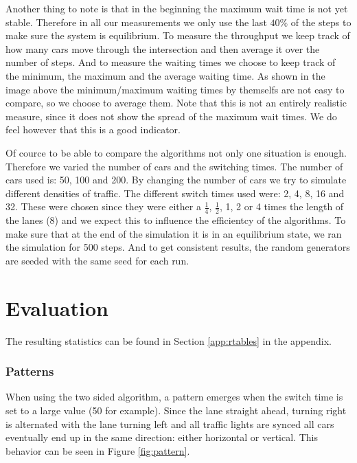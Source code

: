 \documentclass[a4paper,11pt]{article}
\begin{document}
Another thing to note is that in the beginning the maximum wait time is not yet stable.
Therefore in all our measurements we only use the last $40\%$ of the steps to make sure the system is equilibrium.
To measure the throughput we keep track of how many cars move through the intersection and then average it over the number of steps.
And to measure the waiting times we choose to keep track of the minimum, the maximum and the average waiting time.
As shown in the image above the minimum/maximum waiting times by themselfs are not easy to compare, so we choose to average them.
Note that this is not an entirely realistic measure, since it does not show the spread of the maximum wait times.
We do feel however that this is a good indicator.


Of cource to be able to compare the algorithms not only one situation is enough.
Therefore we varied the number of cars and the switching times.
The number of cars used is: 50, 100 and 200.
By changing the number of cars we try to simulate different densities of traffic.
The different switch times used were: 2, 4, 8, 16 and 32.
These were chosen since they were either a $\frac{1}{4}$, $\frac{1}{2}$, 1, 2 or 4 times the length of the lanes (8) and we expect this to influence the efficientcy of the algorithms.
To make sure that at the end of the simulation it is in an equilibrium state, we ran the simulation for 500 steps.
And to get consistent results, the random generators are seeded with the same seed for each run.

\section{Evaluation}\label{sec:eval}

The resulting statistics can be found in Section \ref{app:rtables} in the appendix.


\subsubsection*{Patterns}
When using the two sided algorithm, a pattern emerges when the switch time is set to a large value (50 for example).
Since the lane straight ahead, turning right is alternated with the lane turning left and all traffic lights are
synced all cars eventually end up in the same direction: either horizontal or vertical.
This behavior can be seen in Figure \ref{fig:pattern}.
\end{document}

